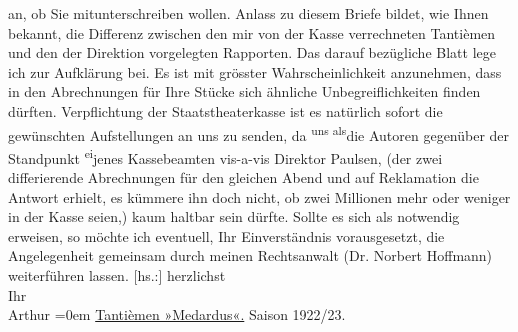 \begin{ledgroupsized}[t]{13cm}
               an, ob Sie mitunterschreiben wollen. Anlass zu diesem Briefe bildet, wie Ihnen
               bekannt, die Differenz zwischen den mir von der Kasse verrechneten Tantièmen und den
               der Direktion vorgelegten Rapporten. Das darauf bezügliche Blatt lege ich zur
               Aufklärung bei.\pend
           \pstart
           Es ist mit grösster Wahrscheinlichkeit anzunehmen, dass in den Abrechnungen für Ihre
               Stücke sich ähnliche Unbegreiflichkeiten finden dürften.\pend
           \pstart
           Verpflichtung der Staatstheaterkasse ist es
               natürlich sofort die gewünschten Aufstellungen an uns zu senden, da \substVorne{}\textsuperscript{uns als}{\allowbreak}\substDazwischen{}die\substHinten{} Autoren gegenüber der Standpunkt \substVorne{}\textsuperscript{ei}\substDazwischen{}je\substHinten{}nes Kassebeamten vis-a-vis Direktor Paulsen, \introOben{}(\introOben{}der zwei differierende Abrechnungen für
               den gleichen Abend und auf Reklamation die Antwort erhielt, es kümmere ihn doch
               nicht, ob zwei Millionen mehr oder weniger in der Kasse seien,\introOben{})\introOben{} kaum haltbar sein dürfte.\pend
           \pstart
           Sollte es sich als notwendig erweisen, so möchte ich eventuell, Ihr Einverständnis
               vorausgesetzt, die Angelegenheit gemeinsam durch meinen Rechtsanwalt (Dr. Norbert Hoffmann) weiterführen lassen.\pend
           \pstart
           {[}hs.:{]} herzlichst{\\[\baselineskip]}Ihr{\\[\baselineskip]}\spacefill\mbox{Arthur}\pend
           \leftskip=0em{}\pstart
           \noindent{}\centering{}{\pb}\uline{Tantièmen »Medardus«.}\pend
           \pstart
           \noindent{}\centering{}Saison 1922/23.\pend
           \settowidth{\longeste}{Kassenrapporte:}\settowidth{\longestz}{}\settowidth{\longestd}{Mir verrechnet:}\settowidth{\longestv}{12,651.673}\settowidth{\longestf}{}\addtolength\longeste{1em}

\end{ledgroupsized}
